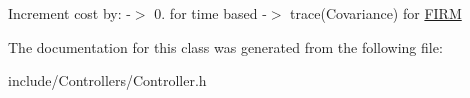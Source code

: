 \-Increment cost by\-: -\/$>$ 0. for time based -\/$>$ trace(\-Covariance) for \hyperlink{class_f_i_r_m}{\-F\-I\-R\-M}

\-The documentation for this class was generated from the following file\-:\begin{DoxyCompactItemize}
\item 
include/\-Controllers/\-Controller.\-h\end{DoxyCompactItemize}
